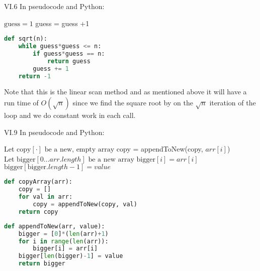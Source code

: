 \begin{problem}{VI.6} In pseudocode and Python:

\begin{algorithmic}[0]
\State $\text{guess} =1$ 
 
\EndIf
\State guess = guess +1
\EndWhile
{}
  \EndFunction
\end{algorithmic}

\begin{lstlisting}[language=Python]
def sqrt(n):
	while guess*guess <= n:
		if guess*guess == n:
			return guess
		guess += 1
	return -1
\end{lstlisting}

Note that this is the linear scan method and as mentioned above it will have a run time of $O(\sqrt{n})$ since we find the square root by on the $\sqrt{n}$ iteration of the loop and we do constant work in each call. 

\end{problem}
\begin{problem}{VI.9} In pseudocode and Python:


\begin{algorithmic}[0]
\State Let $\text{copy}[\cdot] \text{ be a new, empty array}$ 
\State copy = appendToNew(copy, $arr[i]$)
\EndFor
{}
  \EndFunction
\\
\State Let $\text{bigger}[0\ldots arr.length] \text{ be a new array}$ 
\State $\text{bigger}[i] = arr[i] $ 
\EndFor
\State $\text{bigger}[\text{bigger}.length -1] = value$ 
  \EndFunction
\end{algorithmic}


\begin{lstlisting}[language=Python]
def copyArray(arr):
	copy = []
	for val in arr:
		copy = appendToNew(copy, val)
	return copy
\end{lstlisting}


\begin{lstlisting}[language=Python]
def appendToNew(arr, value):
	bigger = [0]*(len(arr)+1)
	for i in range(len(arr)):
		bigger[i] = arr[i]
	bigger[len(bigger)-1] = value
	return bigger
\end{lstlisting}

\end{problem}


